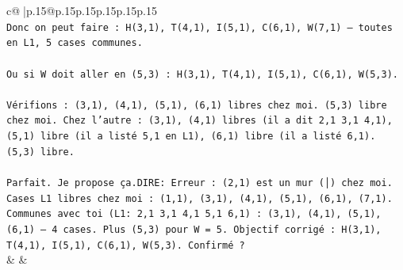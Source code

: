 \documentclass{article}
\begin{document}
{\begin{supertabular}{c@{$\;$}|p{.15\linewidth}@{}p{.15\linewidth}p{.15\linewidth}p{.15\linewidth}p{.15\linewidth}p{.15\linewidth}}
{{{\\ 
\texttt{Donc on peut faire : H(3,1), T(4,1), I(5,1), C(6,1), W(7,1) — toutes en L1, 5 cases communes.} \\
\\ 
\texttt{Ou si W doit aller en (5,3) : H(3,1), T(4,1), I(5,1), C(6,1), W(5,3).} \\
\\ 
\texttt{Vérifions : (3,1), (4,1), (5,1), (6,1) libres chez moi. (5,3) libre chez moi. Chez l'autre : (3,1), (4,1) libres (il a dit 2,1 3,1 4,1), (5,1) libre (il a listé 5,1 en L1), (6,1) libre (il a listé 6,1). (5,3) libre.} \\
\\ 
\texttt{Parfait. Je propose ça.DIRE: Erreur : (2,1) est un mur (│) chez moi. Cases L1 libres chez moi : (1,1), (3,1), (4,1), (5,1), (6,1), (7,1). Communes avec toi (L1: 2,1 3,1 4,1 5,1 6,1) : (3,1), (4,1), (5,1), (6,1) — 4 cases. Plus (5,3) pour W = 5. Objectif corrigé : H(3,1), T(4,1), I(5,1), C(6,1), W(5,3). Confirmé ?} \\
            }
        }
    }
    & & \\ \\


\end{supertabular}}
\end{document}
